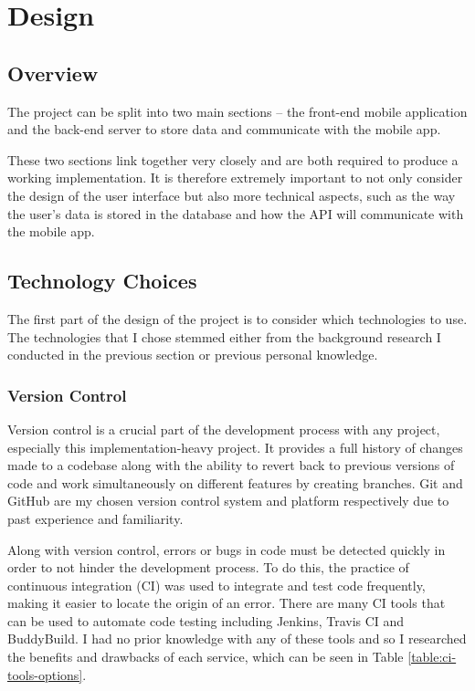 \chapter{Design}

\section{Overview}

The project can be split into two main sections -- the front-end mobile application and the back-end server to store data and communicate with the mobile app.

These two sections link together very closely and are both required to produce a working implementation. It is therefore extremely important to not only consider the design of the user interface but also more technical aspects, such as the way the user's data is stored in the database and how the API will communicate with the mobile app.

\section{Technology Choices}

The first part of the design of the project is to consider which technologies to use. The technologies that I chose stemmed either from the background research I conducted in the previous section or previous personal knowledge.



\subsection{Version Control}

Version control is a crucial part of the development process with any project, especially this implementation-heavy project. It provides a full history of changes made to a codebase along with the ability to revert back to previous versions of code and work simultaneously on different features by creating branches. Git and GitHub are my chosen version control system and platform respectively due to past experience and familiarity.

Along with version control, errors or bugs in code must be detected quickly in order to not hinder the development process. To do this, the practice of continuous integration (CI) was used to integrate and test code frequently, making it easier to locate the origin of an error. There are many CI tools that can be used to automate code testing including Jenkins, Travis CI and BuddyBuild. I had no prior knowledge with any of these tools and so I researched the benefits and drawbacks of each service, which can be seen in Table \ref{table:ci-tools-options}.

